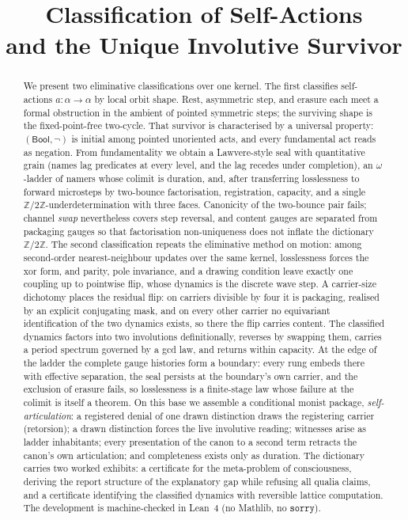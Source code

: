\documentclass[11pt,a4paper]{article}
\title{Classification of Self-Actions\\[0.25em]
  and the Unique Involutive Survivor}
\author{} %
\date{}
\theoremstyle{plain}
\theoremstyle{definition}
\theoremstyle{remark}
\newcommand{\Bool}{\mathsf{Bool}}
\newcommand{\Ztwo}{\mathbb{Z}/2\mathbb{Z}}
\begin{document}
\maketitle

\begin{abstract}
We present two eliminative classifications over one kernel. The first
classifies self-actions $a:\alpha\to\alpha$ by local orbit shape. Rest,
asymmetric step, and erasure each meet a formal obstruction in the ambient
of pointed symmetric steps; the surviving shape is the fixed-point-free
two-cycle. That survivor is characterised by a universal property:
$(\Bool,\neg)$ is initial among pointed unoriented acts, and every
fundamental act reads as negation. From fundamentality we obtain a
Lawvere-style seal with quantitative grain (names lag predicates at every
level, and the lag recedes under completion), an $\omega$-ladder of namers
whose colimit is duration, and, after transferring losslessness to forward
microsteps by two-bounce factorisation, registration, capacity, and a
single $\Ztwo$-underdetermination with three faces. Canonicity of the
two-bounce pair fails; channel \emph{swap} nevertheless covers step
reversal, and content gauges are separated from packaging gauges so that
factorisation non-uniqueness does not inflate the dictionary $\Ztwo$. The
second classification repeats the eliminative method on motion: among
second-order nearest-neighbour updates over the same kernel, losslessness
forces the xor form, and parity, pole invariance, and a drawing condition
leave exactly one coupling up to pointwise flip, whose dynamics is the
discrete wave step. A carrier-size dichotomy places the residual flip:
on carriers divisible by four it is packaging, realised by an explicit
conjugating mask, and on every other carrier no equivariant
identification of the two dynamics exists, so there the flip carries
content. The classified dynamics factors into two involutions
definitionally, reverses by swapping them, carries a period spectrum
governed by a gcd law, and returns within capacity. At the edge of the
ladder the complete gauge histories form a boundary: every rung embeds
there with effective separation, the seal persists at the boundary's own
carrier, and the exclusion of erasure fails, so losslessness is a
finite-stage law whose failure at the colimit is itself a theorem. On
this base we assemble a conditional monist package,
\emph{self-articulation}: a registered denial of one drawn distinction
draws the registering carrier (retorsion); a drawn distinction forces the
live involutive reading; witnesses arise as ladder inhabitants; every
presentation of the canon to a second term retracts the canon's own
articulation; and completeness exists only as duration. The dictionary
carries two worked exhibits: a certificate for the meta-problem of
consciousness, deriving the report structure of the explanatory gap while
refusing all qualia claims, and a certificate identifying the classified
dynamics with reversible lattice computation. The development is
machine-checked in Lean~4 (no Mathlib, no $\mathtt{sorry}$).
\end{abstract}
\end{document}
